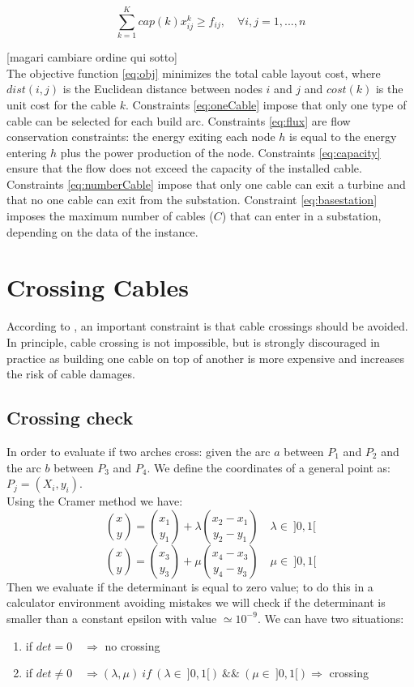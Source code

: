 \begin{equation}\label{eq:capacity}
	\sum^K_{k=1} cap(k)x^k_{ij} \geq f_{ij}, \quad \forall i,j = 1,...,n
\end{equation}

[magari cambiare ordine qui sotto]\\
The objective function \ref{eq:obj} minimizes the total cable layout cost, where $dist(i, j)$ is the Euclidean distance between nodes $i$ and $j$ and $cost(k)$ is the unit cost for the cable $k$. 
Constraints \ref{eq:oneCable} impose that only one type of cable can be selected for each build arc.
Constraints \ref{eq:flux} are flow conservation constraints: the energy exiting each node $h$ is equal to the energy entering $h$ plus the power production of the node. 
Constraints \ref{eq:capacity} ensure that the flow does not exceed the capacity of the installed cable.
Constraints \ref{eq:numberCable} impose that only one cable can exit a turbine and that no one cable can exit from the substation. 
Constraint \ref{eq:basestation} imposes the maximum number of cables ($C$) that can enter in a substation, depending on the data of the instance. 
\section{Crossing Cables}
According to \cite{wfcp}, an important constraint is that cable crossings should be avoided. In principle, cable crossing is not impossible, but is strongly discouraged in practice as building one cable on top of another is more expensive and increases the risk of cable damages.\\

\subsection{Crossing check}
In order to evaluate if two arches cross: given the arc $a$ between $P_1$ and $P_2$ and the arc $b$ between $P_3$ and $P_4$. We define the coordinates of a general point as: $P_j = (X_i, y_i)$. \\
Using the Cramer method we have:
\[
{x \choose y} = {x_1 \choose y_1}+ \lambda {x_2 - x_1 \choose y_2 - y_1} \quad \lambda \in \ ]0, 1[
\]   
\[
{x \choose y} = {x_3 \choose y_3}+ \mu {x_4 - x_3 \choose y_4 - y_3} \quad \mu \in \ ]0, 1[
\]    
Then we evaluate if the determinant is equal to zero value; to do this in a calculator environment avoiding mistakes we will check if the determinant is smaller than a constant epsilon with value $\simeq 10^{-9}$. We can have two situations:
\begin{enumerate}
\item if $det=0 \quad \Rightarrow$ no crossing 
\item if $det \neq 0 \quad \Rightarrow (\lambda, \mu) \ if \ (\lambda \in \ ]0, 1[) \ \&\& \ (\mu \in \ ]0, 1[) \Rightarrow $ crossing
\end{enumerate}                                                   

